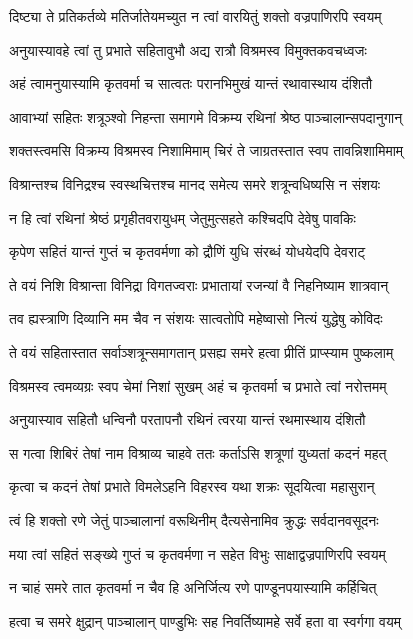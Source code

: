 \twolineshloka
{दिष्ट्या ते प्रतिकर्तव्ये मतिर्जातेयमच्युत}
{न त्वां वारयितुं शक्तो वज्रपाणिरपि स्वयम्}


\twolineshloka
{अनुयास्यावहे त्वां तु प्रभाते सहितावुभौ}
{अद्य रात्रौ विश्रमस्व विमुक्तकवचध्वजः}


\twolineshloka
{अहं त्वामनुयास्यामि कृतवर्मा च सात्वतः}
{परानभिमुखं यान्तं रथावास्थाय दंशितौ}


\twolineshloka
{आवाभ्यां सहितः शत्रूञ्श्वो निहन्ता समागमे}
{विक्रम्य रथिनां श्रेष्ठ पाञ्चालान्सपदानुगान्}


\twolineshloka
{शक्तस्त्वमसि विक्रम्य विश्रमस्व निशामिमाम्}
{चिरं ते जाग्रतस्तात स्वप तावन्निशामिमाम्}


\twolineshloka
{विश्रान्तश्च विनिद्रश्च स्वस्थचित्तश्च मानद}
{समेत्य समरे शत्रून्वधिष्यसि न संशयः}


\twolineshloka
{न हि त्वां रथिनां श्रेष्ठं प्रगृहीतवरायुधम्}
{जेतुमुत्सहते कश्चिदपि देवेषु पावकिः}


\twolineshloka
{कृपेण सहितं यान्तं गुप्तं च कृतवर्मणा}
{को द्रौणिं युधि संरब्धं योधयेदपि देवराट्}


\twolineshloka
{ते वयं निशि विश्रान्ता विनिद्रा विगतज्वराः}
{प्रभातायां रजन्यां वै निहनिष्याम शात्रवान्}


\twolineshloka
{तव ह्यस्त्राणि दिव्यानि मम चैव न संशयः}
{सात्वतोपि महेष्वासो नित्यं युद्धेषु कोविदः}


\twolineshloka
{ते वयं सहितास्तात सर्वाञ्शत्रून्समागतान्}
{प्रसह्य समरे हत्वा प्रीतिं प्राप्स्याम पुष्कलाम्}


\twolineshloka
{विश्रमस्व त्वमव्यग्रः स्वप चेमां निशां सुखम्}
{अहं च कृतवर्मा च प्रभाते त्वां नरोत्तमम्}


\twolineshloka
{अनुयास्याव सहितौ धन्विनौ परतापनौ}
{रथिनं त्वरया यान्तं रथमास्थाय दंशितौ}


\twolineshloka
{स गत्वा शिबिरं तेषां नाम विश्राव्य चाहवे}
{ततः कर्ताऽसि शत्रूणां युध्यतां कदनं महत्}


\twolineshloka
{कृत्वा च कदनं तेषां प्रभाते विमलेऽहनि}
{विहरस्व यथा शक्रः सूदयित्वा महासुरान्}


\twolineshloka
{त्वं हि शक्तो रणे जेतुं पाञ्चालानां वरूथिनीम्}
{दैत्यसेनामिव क्रुद्धः सर्वदानवसूदनः}


\twolineshloka
{मया त्वां सहितं सङ्ख्ये गुप्तं च कृतवर्मणा}
{न सहेत विभुः साक्षाद्वज्रपाणिरपि स्वयम्}


\twolineshloka
{न चाहं समरे तात कृतवर्मा न चैव हि}
{अनिर्जित्य रणे पाण्डूनपयास्यामि कर्हिचित्}


\twolineshloka
{हत्वा च समरे क्षुद्रान् पाञ्चालान् पाण्डुभिः सह}
{निवर्तिष्यामहे सर्वे हता वा स्वर्गगा वयम्}


